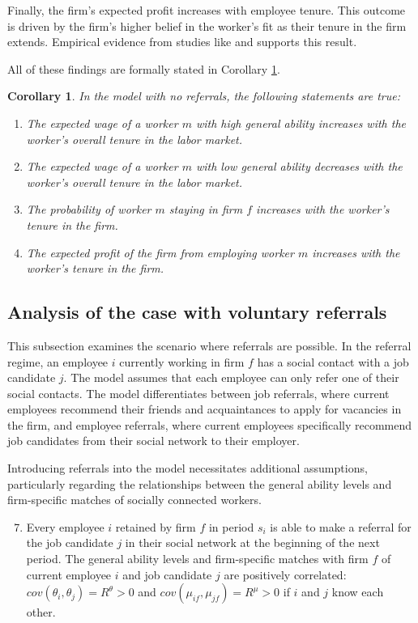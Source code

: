 \documentclass[12pt]{article}
\newtheorem{corollary}[theorem]{Corollary}
\begin{document}
Finally, the firm's expected profit increases with employee tenure. This outcome is driven by the firm's higher belief in the worker's fit as their tenure in the firm extends. Empirical evidence from studies like \cite{quinones1995relationship} and \cite{ng2010organizational} supports this result.

All of these findings are formally stated in Corollary \ref{cor:results_NR}.

\begin{corollary}\label{cor:results_NR}
    In the model with no referrals, the following statements are true:
    \begin{enumerate}[label={\roman*})]
        \item The expected wage of a worker $m$ with high general ability increases with the worker's overall tenure in the labor market.
        \item The expected wage of a worker $m$ with low general ability decreases with the worker's overall tenure in the labor market.
        \item The probability of worker $m$ staying in firm $f$ increases with the worker's tenure in the firm.
        \item The expected profit of the firm from employing worker $m$ increases with the worker's tenure in the firm.
    \end{enumerate}
\end{corollary}


\subsection{Analysis of the case with voluntary referrals}
This subsection examines the scenario where referrals are possible. In the referral regime, an employee $i$ currently working in firm $f$ has a social contact with a job candidate $j$. The model assumes that each employee can only refer one of their social contacts. The model differentiates between job referrals, where current employees recommend their friends and acquaintances to apply for vacancies in the firm, and employee referrals, where current employees specifically recommend job candidates from their social network to their employer.

Introducing referrals into the model necessitates additional assumptions, particularly regarding the relationships between the general ability levels and firm-specific matches of socially connected workers.

\begin{enumerate}[label={A}{\arabic*}.]
\setcounter{enumi}{6}
    \item Every employee $i$ retained by firm $f$ in period $s_i$ is able to make a referral for the job candidate $j$ in their social network at the beginning of the next period. The general ability levels and firm-specific matches with firm $f$ of current employee $i$ and job candidate $j$ are positively correlated: $cov(\theta_{i},\theta_{j})=R^\theta >0$ and $cov(\mu_{if},\mu_{jf})=R^\mu >0$ if $i$ and $j$ know each other.
\end{enumerate}
\end{document}
